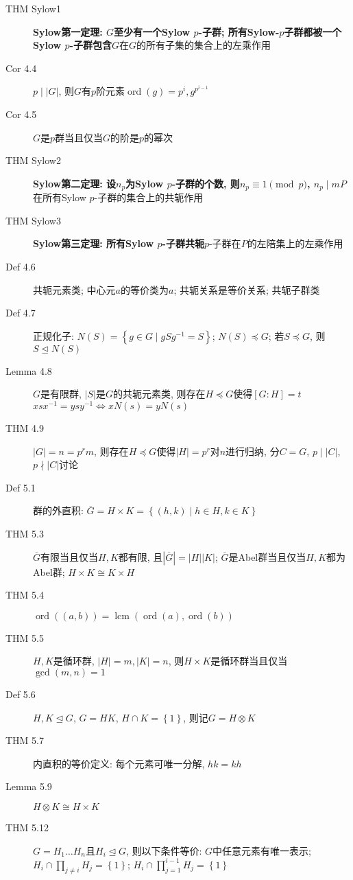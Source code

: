 \documentclass{article}
\renewcommand{\l}{\left}
\renewcommand{\r}{\right}
\newcommand{\ord}{\operatorname{ord}}
\newcommand{\lcm}{\operatorname{lcm}}
\begin{document}
\begin{description}
        \item[THM Sylow1] \textbf{Sylow第一定理: $G$至少有一个Sylow $p$-子群; 所有Sylow-$p$子群都被一个Sylow $p$-子群包含}\hfill$G$在$G$的所有子集的集合上的左乘作用
        \item[Cor 4.4] $p \mid \l| G \r|$, 则$G$有$p$阶元素\hfill$\ord(g) = p^i, g^{p^{i-1}}$
        \item[Cor 4.5] $G$是$p$群当且仅当$G$的阶是$p$的幂次
        \item[THM Sylow2] \textbf{Sylow第二定理: 设$n_p$为Sylow $p$-子群的个数, 则$n_p \equiv 1 \pmod p$, $n_p \mid m$}\hfill$P$在所有Sylow $p$-子群的集合上的共轭作用
        \item[THM Sylow3] \textbf{Sylow第三定理: 所有Sylow $p$-子群共轭}\hfill$p$-子群在$P$的左陪集上的左乘作用
        \item[Def 4.6] 共轭元素类; 中心元$a$的等价类为$a$; 共轭关系是等价关系; 共轭子群类
        \item[Def 4.7] 正规化子: $N(S) = \l\{ g\in G \mid gSg^{-1} = S\r\}$; $N(S) \preceq G$; 若$S \preceq G$, 则$S \trianglelefteq N(S)$
        \item[Lemma 4.8] $G$是有限群, $\l|S\r|$是$G$的共轭元素类, 则存在$H \preceq G$使得$[G:H] = t$\hfill$xsx^{-1} = ysy^{-1} \iff xN(s) = yN(s)$
        \item[THM 4.9] $\l|G\r| = n = p^rm$, 则存在$H \preceq G$使得$\l|H\r| = p^r$\hfill 对$n$进行归纳, 分$C=G$, $p\mid\l|C\r|$, $p\nmid\l|C\r|$讨论
        \item[Def 5.1] 群的外直积: $\overline G = H \times K = \l\{ (h, k) \mid h \in H, k \in K \r\}$
        \item[THM 5.3] $\overline G$有限当且仅当$H, K$都有限, 且$\l|\overline G\r| = \l|H\r|\l|K\r|$; $\overline G$是Abel群当且仅当$H, K$都为Abel群; $H \times K \cong K \times H$
        \item[THM 5.4] $\ord((a, b)) = \lcm(\ord(a), \ord(b))$
        \item[THM 5.5] $H, K$是循环群, $\l|H\r| = m, \l|K\r| = n$, 则$H \times K$是循环群当且仅当$\gcd(m, n) = 1$
        \item[Def 5.6] $H, K \trianglelefteq G$, $G = HK$, $H \cap K = \l\{1\r\}$, 则记$G = H \otimes K$
        \item[THM 5.7] 内直积的等价定义: 每个元素可唯一分解, $hk = kh$
        \item[Lemma 5.9] $H \otimes K \cong H \times K$
        \item[THM 5.12] $G = H_1 \dots H_n$且$H_i \trianglelefteq G$, 则以下条件等价: $G$中任意元素有唯一表示; $H_i \cap \prod\limits_{j \ne i} H_j = \l\{1\r\}$; $H_i \cap \prod\limits_{j = 1}^{i-1} H_j = \l\{1\r\}$

\end{description}
\end{document}
